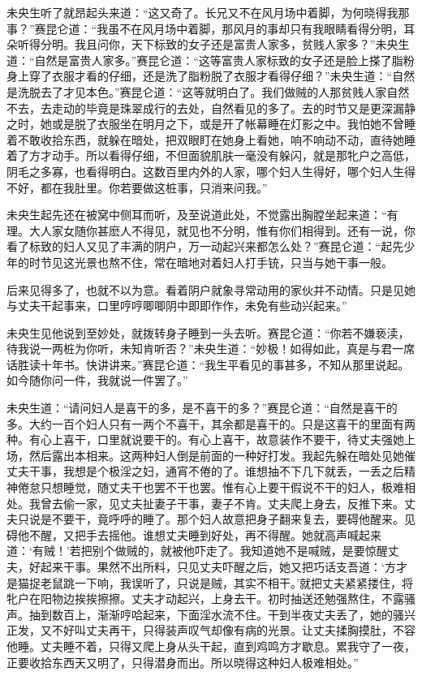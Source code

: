 \documentclass[a4paper,12pt,UTF8,twoside]{ctexbook}
\begin{document}
未央生听了就昂起头来道：“这又奇了。长兄又不在风月场中着脚，为何晓得我那事？”赛昆仑道：“我虽不在风月场中着脚，那风月的事却只有我眼睛看得分明，耳朵听得分明。我且问你，天下标致的女子还是富贵人家多，贫贱人家多？”未央生道：“自然是富贵人家多。”赛昆仑道：“这等富贵人家标致的女子还是脸上搽了脂粉身上穿了衣服才看的仔细，还是洗了脂粉脱了衣服才看得仔细？”未央生道：“自然是洗脱去了才见本色。”赛昆仑道：“这等就明白了。我们做贼的人那贫贱人家自然不去，去走动的毕竟是珠翠成行的去处，自然看见的多了。去的时节又是更深漏静之时，她或是脱了衣服坐在明月之下，或是开了帐幕睡在灯影之中。我怕她不曾睡着不敢收拾东西，就躲在暗处，把双眼盯在她身上看她，响不响动不动，直待她睡着了方才动手。所以看得仔细，不但面貌肌肤一毫没有躲闪，就是那牝户之高低，阴毛之多寡，也看得明白。这数百里内外的人家，哪个妇人生得好，哪个妇人生得不好，都在我肚里。你若要做这桩事，只消来问我。”

未央生起先还在被窝中侧耳而听，及至说道此处，不觉露出胸膛坐起来道：“有理。大人家女随你甚麽人不得见，就见也不分明，惟有你们相得到。还有一说，你看了标致的妇人又见了丰满的阴户，万一动起兴来都怎么处？”赛昆仑道：“起先少年的时节见这光景也熬不住，常在暗地对着妇人打手铳，只当与她干事一般。

后来见得多了，也就不以为意。看着阴户就象寻常动用的家伙并不动情。只是见她与丈夫干起事来，口里哼哼唧唧阴中即即作作，未免有些动兴起来。”

未央生见他说到至妙处，就拨转身子睡到一头去听。赛昆仑道：“你若不嫌亵渎，待我说一两桩为你听，未知肯听否？”未央生道：“妙极！如得如此，真是与君一席话胜读十年书。快讲讲来。”赛昆仑道：“我生平看见的事甚多，不知从那里说起。如今随你问一件，我就说一件罢了。”

未央生道：“请问妇人是喜干的多，是不喜干的多？”赛昆仑道：“自然是喜干的多。大约一百个妇人只有一两个不喜干，其余都是喜干的。只是这喜干的里面有两种。有心上喜干，口里就说要干的。有心上喜干，故意装作不要干，待丈夫强她上场，然后露出本相来。这两种妇人倒是前面的一种好打发。我起先躲在暗处见她催丈夫干事，我想是个极淫之妇，通宵不倦的了。谁想抽不下几下就丢，一丢之后精神倦怠只想睡觉，随丈夫干也罢不干也罢。惟有心上要干假说不干的妇人，极难相处。我曾去偷一家，见丈夫扯妻子干事，妻子不肯。丈夫爬上身去，反推下来。丈夫只说是不要干，竟呼呼的睡了。那个妇人故意把身子翻来复去，要碍他醒来。见碍他不醒，又把手去摇他。谁想丈夫睡到好处，再不得醒。她就高声喊起来道：‘有贼！’若把别个做贼的，就被他吓走了。我知道她不是喊贼，是要惊醒丈夫，好起来干事。果然不出所料，只见丈夫吓醒之后，她又把巧话支吾道：‘方才是猫捉老鼠跳一下响，我误听了，只说是贼，其实不相干。’就把丈夫紧紧搂住，将牝户在阳物边挨挨擦擦。丈夫才动起兴，上身去干。初时抽送还勉强熬住，不露骚声。抽到数百上，渐渐哼哈起来，下面淫水流不住。干到半夜丈夫丢了，她的骚兴正发，又不好叫丈夫再干，只得装声叹气却像有病的光景。让丈夫揉胸摸肚，不容他睡。丈夫睡不着，只得又爬上身从头干起，直到鸡鸣方才歇息。累我守了一夜，正要收拾东西天又明了，只得潜身而出。所以晓得这种妇人极难相处。”
\end{document}
